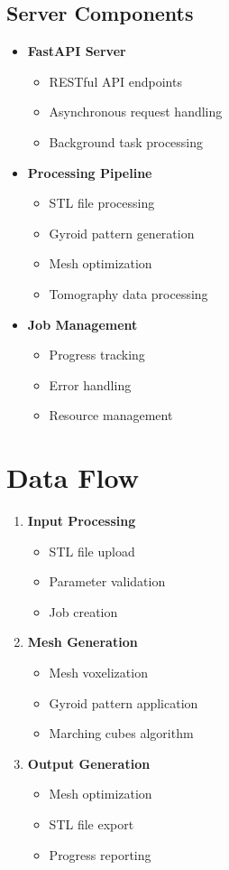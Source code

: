 \subsection{Server Components}
\begin{itemize}
    \item \textbf{FastAPI Server}
        \begin{itemize}
            \item RESTful API endpoints
            \item Asynchronous request handling
            \item Background task processing
        \end{itemize}
    \item \textbf{Processing Pipeline}
        \begin{itemize}
            \item STL file processing
            \item Gyroid pattern generation
            \item Mesh optimization
            \item Tomography data processing
        \end{itemize}
    \item \textbf{Job Management}
        \begin{itemize}
            \item Progress tracking
            \item Error handling
            \item Resource management
        \end{itemize}
\end{itemize}

\section{Data Flow}
\begin{enumerate}
    \item \textbf{Input Processing}
        \begin{itemize}
            \item STL file upload
            \item Parameter validation
            \item Job creation
        \end{itemize}
    \item \textbf{Mesh Generation}
        \begin{itemize}
            \item Mesh voxelization
            \item Gyroid pattern application
            \item Marching cubes algorithm
        \end{itemize}
    \item \textbf{Output Generation}
        \begin{itemize}
            \item Mesh optimization
            \item STL file export
            \item Progress reporting
        \end{itemize}
\end{enumerate}


